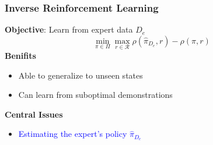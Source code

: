 \documentclass{beamer}
\begin{document}
\begin{frame}
	\frametitle{Inverse Reinforcement Learning}
	\textbf{Objective}: Learn from expert data $D_e$
	\[ 
		\min_{\pi \in \Pi} \max_{r \in \mathcal{R}} \rho(\hat{\pi}_{D_e}, r) - \rho(\pi, r)
	\]
	\vfill
	\textbf{Benifits}
	\begin{itemize}
		\item Able to generalize to unseen states
		\item Can learn from suboptimal demonstrations
	\end{itemize}
	\vfill
	\textbf{Central Issues}
	\begin{itemize}
		\item \textcolor{blue}{Estimating the expert's policy $\hat{\pi}_{D_e}$}
	\end{itemize}
\end{frame}
\end{document}
